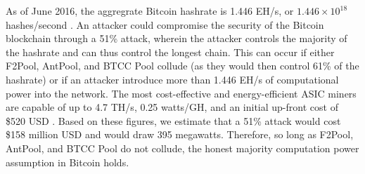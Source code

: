 \documentclass[USenglish,oneside,twocolumn]{article}
\begin{document}

As of June 2016, the aggregrate Bitcoin hashrate is 1.446 EH/s, or $ 1.446 \times 10^{18} $ hashes/second \cite{BitInfoCharts}. An attacker could compromise the security of the Bitcoin blockchain through a 51\% attack, wherein the attacker controls the majority of the hashrate and can thus control the longest chain. This can occur if either F2Pool, AntPool, and BTCC Pool collude (as they would then control 61\% of the hashrate) or if an attacker introduce more than 1.446 EH/s of computational power into the network. The most cost-effective and energy-efficient ASIC miners are capable of up to 4.7 TH/s, 0.25 watts/GH, and an initial up-front cost of \$520 USD \cite{MiningHwGuide}. Based on these figures, we estimate that a 51\% attack would cost \$158 million USD and would draw 395 megawatts. Therefore, so long as F2Pool, AntPool, and BTCC Pool do not collude, the honest majority computation power assumption in Bitcoin holds.
\end{document}
